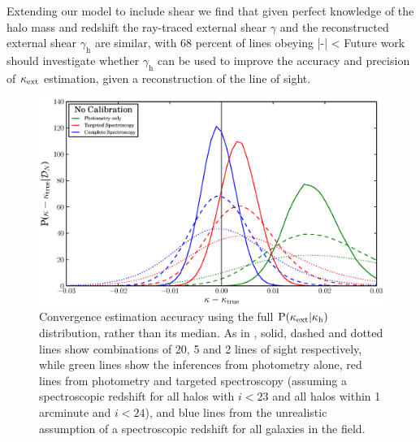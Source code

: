 \documentclass[useAMS,usenatbib]{mn2e}
\begin{document}
Extending our model to include shear we find that given
perfect knowledge of the halo mass and redshift the ray-traced external shear
$\gamma$ and the reconstructed external shear $\gamma_{\mathrm{h}}$  are
similar, with 68 percent of lines obeying
\be
\label{eq:shearineq}
|{\boldmath{\gammax}-}| < 
\ee 
Future work should investigate whether $\gamma_{\mathrm{h}}$ can be used
to improve the accuracy and precision of $\kappa_{\rm ext}$ estimation, given a
reconstruction of the line of sight. 

\begin{figure}
\includegraphics[width=\columnwidth]{figs/biasplots3.eps}
\caption{Convergence estimation accuracy using the full  ${\rm P}(\kappa_{\rm ext}|\kappa_{\rm h})$
distribution, rather than its median.  As in , solid,
dashed and dotted lines show combinations of 20, 5 and 2 lines of sight
respectively, while green lines show the inferences 
from photometry alone, red lines from photometry and targeted spectroscopy 
(assuming a spectroscopic redshift for all
halos with $i<23$ and all halos within 1 arcminute and $i<24$), and blue lines
from the unrealistic assumption of a spectroscopic redshift for all galaxies
in the field. }
\label{fig:no-median-tricks}
\end{figure}
\end{document}
